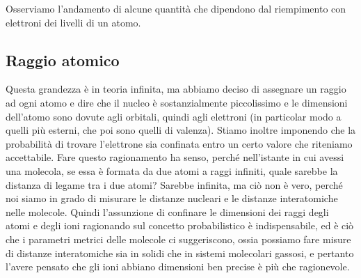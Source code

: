 Osserviamo l'andamento di alcune quantità che dipendono dal riempimento con elettroni dei livelli di un atomo.

\subsection{Raggio atomico}

Questa grandezza è in teoria infinita, ma abbiamo deciso di assegnare un raggio ad ogni atomo e dire che il nucleo è sostanzialmente piccolissimo e le dimensioni dell'atomo sono dovute agli orbitali, quindi agli elettroni (in particolar modo a quelli più esterni, che poi sono quelli di valenza). Stiamo inoltre imponendo che la probabilità di trovare l'elettrone sia confinata entro un certo valore che riteniamo accettabile. Fare questo ragionamento ha senso, perché nell'istante in cui avessi una molecola, se essa è formata da due atomi a raggi infiniti, quale sarebbe la distanza di legame tra i due atomi? Sarebbe infinita, ma ciò non è vero, perché noi siamo in grado di misurare le distanze nucleari e le distanze interatomiche nelle molecole. Quindi l'assunzione di confinare le dimensioni dei raggi degli atomi e degli ioni ragionando sul concetto probabilistico è indispensabile, ed è ciò che i parametri metrici delle molecole ci suggeriscono, ossia possiamo fare misure di distanze interatomiche sia in solidi che in sistemi molecolari gassosi, e pertanto l'avere pensato che gli ioni abbiano dimensioni ben precise è più che ragionevole.

\vspace{-0.6cm}

